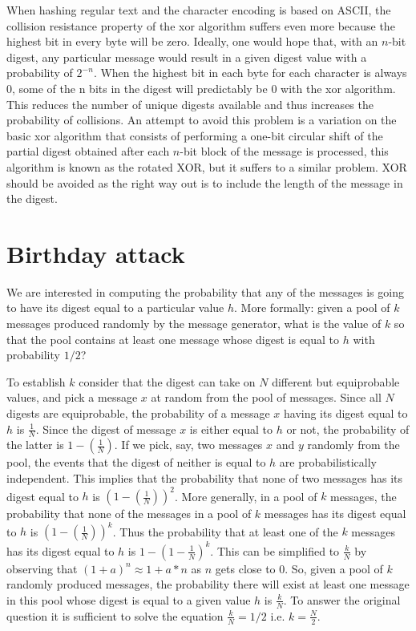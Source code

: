 When hashing regular text and the character encoding is based on ASCII, the
collision resistance property of the xor algorithm suffers even more because the highest bit in every byte will be zero. Ideally, one would hope that, with an $n$-bit digest, any particular message would result in a given digest value with a probability of $2^{-n}$. When the highest bit in each byte for each character is always 0, some of the n bits in the digest will predictably be 0 with the xor algorithm. This reduces the number of unique digests available and thus increases the probability of collisions.
An attempt to avoid this problem is a variation on the basic xor algorithm that consists of performing a one-bit circular shift of the partial digest obtained after each $n$-bit block of the message is processed, this algorithm is known as the rotated XOR, but it suffers to a similar problem. XOR should be avoided as the right way out is to include the length of the message in the digest.

\section{Birthday attack}
We are interested in computing the probability that any of the messages is going to have its digest equal to a particular value $h$. More formally: given a pool of $k$ messages produced randomly by the message generator, what is the value of $k$ so that the pool contains at least one message whose digest is equal to $h$ with probability $1/2$?

To establish $k$ consider that the digest can take on $N$ different but equiprobable values, and pick a message $x$ at random from the pool of messages. Since all $N$ digests are equiprobable, the probability of a message $x$ having its digest equal to $h$ is $\frac{1}{N}$. Since the digest of message $x$ is either equal to $h$ or not, the probability of the latter is $1 - (\frac{1}{N})$.  If we pick, say, two messages $x$ and $y$ randomly from the pool, the events that the digest of neither is equal to $h$ are probabilistically independent. This implies that the probability that none of two messages has its digest equal to $h$ is $(1 - (\frac{1}{N}))^2$. More generally, in a pool of $k$ messages, the probability that none of the messages in a pool of $k$ messages has its digest equal to $h$ is  $(1 - (\frac{1}{N}))^k$. Thus the probability that at least one of the $k$ messages has its digest equal to $h$ is $1 - (1 - \frac{1}{N})^k$. This can be simplified to $\frac{k}{N}$ by observing that $(1 + a)^n \approx 1 + a * n$ as $n$ gets close to $0$. So, given a pool of $k$ randomly produced messages, the probability there will exist at least one message in this pool whose digest is equal to a given value $h$ is $\frac{k}{N}$. To answer the original question it is sufficient to solve the equation $\frac{k}{N} = 1/2$ i.e. $k = \frac{N}{2}$.

